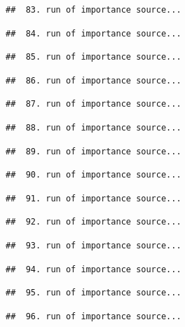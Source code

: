 \documentclass[
]{article}
\begin{document}
\begin{verbatim}
##  83. run of importance source...
\end{verbatim}

\begin{verbatim}
##  84. run of importance source...
\end{verbatim}

\begin{verbatim}
##  85. run of importance source...
\end{verbatim}

\begin{verbatim}
##  86. run of importance source...
\end{verbatim}

\begin{verbatim}
##  87. run of importance source...
\end{verbatim}

\begin{verbatim}
##  88. run of importance source...
\end{verbatim}

\begin{verbatim}
##  89. run of importance source...
\end{verbatim}

\begin{verbatim}
##  90. run of importance source...
\end{verbatim}

\begin{verbatim}
##  91. run of importance source...
\end{verbatim}

\begin{verbatim}
##  92. run of importance source...
\end{verbatim}

\begin{verbatim}
##  93. run of importance source...
\end{verbatim}

\begin{verbatim}
##  94. run of importance source...
\end{verbatim}

\begin{verbatim}
##  95. run of importance source...
\end{verbatim}

\begin{verbatim}
##  96. run of importance source...
\end{verbatim}
\end{document}
